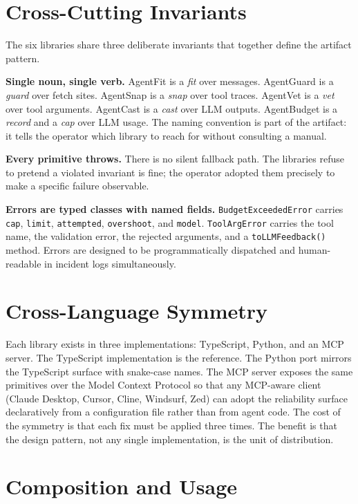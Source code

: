 \documentclass[sigconf,review]{acmart}
\begin{document}
\section{Cross-Cutting Invariants}

The six libraries share three deliberate invariants that together define the artifact pattern.

\textbf{Single noun, single verb.} AgentFit is a \emph{fit} over messages. AgentGuard is a \emph{guard} over fetch sites. AgentSnap is a \emph{snap} over tool traces. AgentVet is a \emph{vet} over tool arguments. AgentCast is a \emph{cast} over LLM outputs. AgentBudget is a \emph{record} and a \emph{cap} over LLM usage. The naming convention is part of the artifact: it tells the operator which library to reach for without consulting a manual.

\textbf{Every primitive throws.} There is no silent fallback path. The libraries refuse to pretend a violated invariant is fine; the operator adopted them precisely to make a specific failure observable.

\textbf{Errors are typed classes with named fields.} \texttt{Budget\-Exceeded\-Error} carries \texttt{cap}, \texttt{limit}, \texttt{attempted}, \texttt{overshoot}, and \texttt{model}. \texttt{ToolArgError} carries the tool name, the validation error, the rejected arguments, and a \texttt{toLLM\-Feedback()} method. Errors are designed to be programmatically dispatched and human-readable in incident logs simultaneously.

\section{Cross-Language Symmetry}

Each library exists in three implementations: TypeScript, Python, and an MCP server. The TypeScript implementation is the reference. The Python port mirrors the TypeScript surface with snake-case names. The MCP server exposes the same primitives over the Model Context Protocol so that any MCP-aware client (Claude Desktop, Cursor, Cline, Windsurf, Zed) can adopt the reliability surface declaratively from a configuration file rather than from agent code. The cost of the symmetry is that each fix must be applied three times. The benefit is that the design pattern, not any single implementation, is the unit of distribution.

\section{Composition and Usage}
\end{document}
